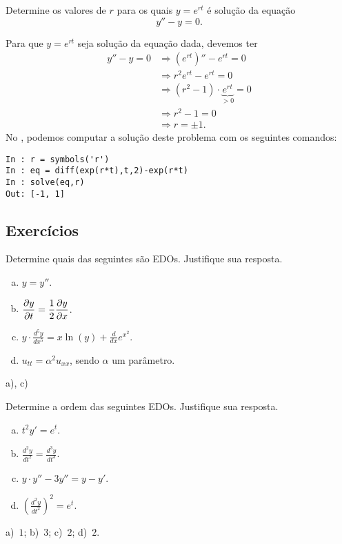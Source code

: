 \begin{exeresol}
  Determine os valores de $r$ para os quais $y = e^{rt}$ é solução da equação
  \begin{equation}
    y'' - y = 0.
  \end{equation}
\end{exeresol}
\begin{exeresol}
  Para que $y = e^{rt}$ seja solução da equação dada, devemos ter
  \begin{align}
    y'' - y = 0 &\Rightarrow \left(e^{rt}\right)'' - e^{rt} = 0 \\
                &\Rightarrow r^2e^{rt} - e^{rt} = 0 \\
                &\Rightarrow (r^2 - 1)\cdot \underbrace{e^{rt}}_{>0} = 0\\
                &\Rightarrow r^2 - 1 = 0 \\
                &\Rightarrow r = \pm 1.
  \end{align}
  \ifispython
  No \python, podemos computar a solução deste problema com os seguintes comandos:
\begin{verbatim}
In : r = symbols('r')
In : eq = diff(exp(r*t),t,2)-exp(r*t)
In : solve(eq,r)
Out: [-1, 1]
\end{verbatim}
  \fi
\end{exeresol}

\subsection*{Exercícios}

\begin{exer}
  Determine quais das seguintes são EDOs. Justifique sua resposta.
  \begin{enumerate}[a)]
  \item $\displaystyle y = y''$.
  \item $\displaystyle \frac{\partial y}{\partial t} = \frac{1}{2}\frac{\partial y}{\partial x}$.
  \item $\displaystyle y\cdot \frac{d^5y}{dx^5} = x\ln(y) + \frac{d}{dx}e^{x^2}$.
  \item $u_{tt} = \alpha^2u_{xx}$, sendo $\alpha$ um parâmetro.
  \end{enumerate}
\end{exer}
\begin{resp}
  a), c)
\end{resp}

\begin{exer}\label{exer:edo_ordem}
  Determine a ordem das seguintes EDOs. Justifique sua resposta.
  \begin{enumerate}[a)]
  \item $\displaystyle t^2y' = e^{t}$.
  \item $\displaystyle \frac{d^2y}{dt^2} = \frac{d^3y}{dt^3}$.
  \item $\displaystyle y\cdot y'' - 3y'' = y - y'$.
  \item $\displaystyle \left(\frac{d^2y}{dt^2}\right)^2 = e^t$.
  \end{enumerate}
\end{exer}
\begin{resp}
  a)~$1$; b)~$3$; c)~$2$; d)~$2$.
\end{resp}

